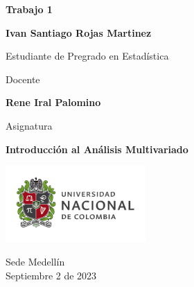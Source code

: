 \begin{titlepage}
   \Large{
   \begin{center}
       \vspace*{1cm}

       \textbf{Trabajo 1}
       
       \vspace{1.5cm}
        
        
       
       \textbf{Ivan Santiago Rojas Martinez} \\
        
       \vspace{1cm}
       
       Estudiante de Pregrado en Estadística
       
       \vspace{1cm}
       
       Docente
       
       \vspace{0.5cm}

       \textbf{Rene Iral Palomino}
       
       \vspace{0.4cm}

       \vspace{1.5cm}
       
       Asignatura
       
       \vspace{0.5cm}

       \textbf{Introducción al Análisis Multivariado}

       \vfill

            
       \vspace{0.1cm}
     
       \includegraphics[width=0.4\textwidth]{DocumentFormat/logounal.png}
            
       Sede Medellín\\
       Septiembre 2 de 2023
       
   \end{center}
   }
\end{titlepage}
